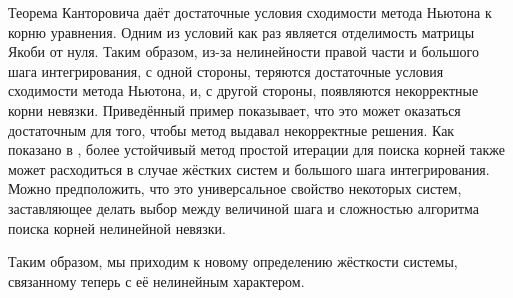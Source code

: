 Теорема Канторовича \cite{kantorovich1949method,ortega2000iterative}
даёт достаточные условия сходимости метода Ньютона к корню уравнения.
Одним из условий как раз является отделимость матрицы Якоби от нуля.
Таким образом, из-за нелинейности правой части и большого шага интегрирования, с одной стороны,
теряются достаточные условия сходимости метода Ньютона, и, с другой стороны, появляются некорректные корни невязки.
Приведённый пример показывает, что это может оказаться достаточным для того, чтобы метод выдавал некорректные решения.
Как показано в \cite{lambert1991methods}, более устойчивый метод простой итерации для поиска корней
также может расходиться в случае жёстких систем и большого шага интегрирования.
Можно предположить, что это универсальное свойство некоторых систем,
заставляющее делать выбор между величиной шага и сложностью алгоритма поиска корней нелинейной невязки.

Таким образом, мы приходим к новому определению жёсткости системы,
связанному теперь с её нелинейным характером.

